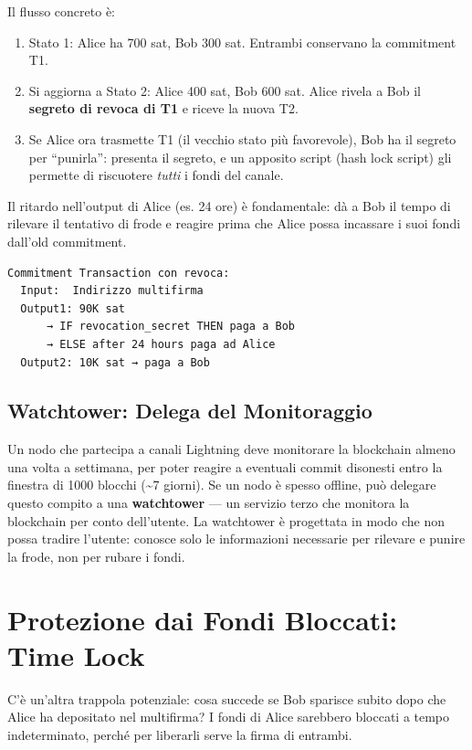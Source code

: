 \documentclass[
  italian,
  openany]{book}
\providecommand{\tightlist}{%
  \setlength{\itemsep}{0pt}\setlength{\parskip}{0pt}}
\begin{document}
Il flusso concreto è:

\begin{enumerate}
\def\labelenumi{\arabic{enumi}.}
\tightlist
\item
  Stato 1: Alice ha 700 sat, Bob 300 sat. Entrambi conservano la
  commitment T1.
\item
  Si aggiorna a Stato 2: Alice 400 sat, Bob 600 sat. Alice rivela a Bob
  il \textbf{segreto di revoca di T1} e riceve la nuova T2.
\item
  Se Alice ora trasmette T1 (il vecchio stato più favorevole), Bob ha il
  segreto per ``punirla'': presenta il segreto, e un apposito script
  (hash lock script) gli permette di riscuotere \emph{tutti} i fondi del
  canale.
\end{enumerate}

Il ritardo nell'output di Alice (es. 24 ore) è fondamentale: dà a Bob il
tempo di rilevare il tentativo di frode e reagire prima che Alice possa
incassare i suoi fondi dall'old commitment.

\begin{verbatim}
Commitment Transaction con revoca:
  Input:  Indirizzo multifirma
  Output1: 90K sat
      → IF revocation_secret THEN paga a Bob
      → ELSE after 24 hours paga ad Alice
  Output2: 10K sat → paga a Bob
\end{verbatim}

\subsection{Watchtower: Delega del
Monitoraggio}\label{watchtower-delega-del-monitoraggio}

Un nodo che partecipa a canali Lightning deve monitorare la blockchain
almeno una volta a settimana, per poter reagire a eventuali commit
disonesti entro la finestra di 1000 blocchi (\textasciitilde7 giorni).
Se un nodo è spesso offline, può delegare questo compito a una
\textbf{watchtower} --- un servizio terzo che monitora la blockchain per
conto dell'utente. La watchtower è progettata in modo che non possa
tradire l'utente: conosce solo le informazioni necessarie per rilevare e
punire la frode, non per rubare i fondi.

\section{Protezione dai Fondi Bloccati: Time
Lock}\label{protezione-dai-fondi-bloccati-time-lock}

C'è un'altra trappola potenziale: cosa succede se Bob sparisce subito
dopo che Alice ha depositato nel multifirma? I fondi di Alice sarebbero
bloccati a tempo indeterminato, perché per liberarli serve la firma di
entrambi.
\end{document}
